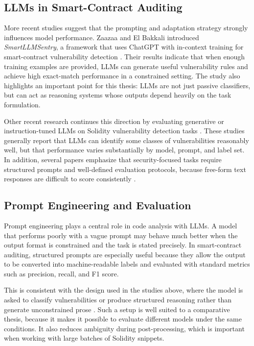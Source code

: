 \documentclass[a4paper,11pt]{article}\usepackage{graphicx} %
\begin{document}
\subsection{LLMs in Smart-Contract Auditing}

More recent studies suggest that the prompting and adaptation strategy strongly influences model performance. Zaazaa and El Bakkali introduced \emph{SmartLLMSentry}, a framework that uses ChatGPT with in-context training for smart-contract vulnerability detection \cite{zaazaa_smartllmsentry_2024}. Their results indicate that when enough training examples are provided, LLMs can generate useful vulnerability rules and achieve high exact-match performance in a constrained setting. The study also highlights an important point for this thesis: LLMs are not just passive classifiers, but can act as reasoning systems whose outputs depend heavily on the task formulation.

Other recent research continues this direction by evaluating generative or instruction-tuned LLMs on Solidity vulnerability detection tasks \cite{kevin_smartllm_2025,ince_generative_2025,noauthor_logic_nodate}. These studies generally report that LLMs can identify some classes of vulnerabilities reasonably well, but that performance varies substantially by model, prompt, and label set. In addition, several papers emphasize that security-focused tasks require structured prompts and well-defined evaluation protocols, because free-form text responses are difficult to score consistently \cite{kevin_smartllm_2025,ince_generative_2025}.

\subsection{Prompt Engineering and Evaluation}

Prompt engineering plays a central role in code analysis with LLMs. A model that performs poorly with a vague prompt may behave much better when the output format is constrained and the task is stated precisely. In smart-contract auditing, structured prompts are especially useful because they allow the output to be converted into machine-readable labels and evaluated with standard metrics such as precision, recall, and F1 score.

This is consistent with the design used in the studies above, where the model is asked to classify vulnerabilities or produce structured reasoning rather than generate unconstrained prose \cite{yang_automated_2023,zaazaa_smartllmsentry_2024,kevin_smartllm_2025}. Such a setup is well suited to a comparative thesis, because it makes it possible to evaluate different models under the same conditions. It also reduces ambiguity during post-processing, which is important when working with large batches of Solidity snippets.
\end{document}
